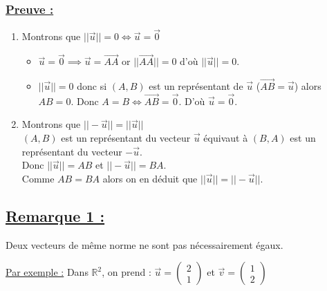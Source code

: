 \documentclass{article}
\begin{document}
\subsubsection*{\underline{\color{red}Preuve :}}
\begin{enumerate}
    \item[i)] Montrons que $||\vec{u}|| = 0 \iff \vec{u} = \vec{0}$
    \begin{itemize}
        \item[$*_{1}$] $\vec{u} = \vec{0} \implies \vec{u} = \overrightarrow{AA}$ or $||\overrightarrow{AA}|| = 0$ d'où $||\vec{u}|| = 0$.
        \item[$*_{2}$] $||\vec{u}|| = 0$ donc si $(A, B)$ est un représentant de $\vec{u}$ ($\overrightarrow{AB} = \vec{u}$) alors $AB = 0$. Donc $A = B \iff \overrightarrow{AB} = \vec{0}$. D'où $\vec{u} = \vec{0}$.
    \end{itemize}
    \item[ii)] Montrons que $||-\vec{u}|| = ||\vec{u}||$ \\
    $(A, B)$ est un représentant du vecteur $\vec{u}$ équivaut à $(B, A)$ est un représentant du vecteur $-\vec{u}$.\\
    Donc $||\vec{u}|| = AB$ et $||-\vec{u}|| = BA$.\\
    Comme $AB = BA$ alors on en déduit que $||\vec{u}|| = ||-\vec{u}||$.
\end{enumerate}

\subsection*{\underline{\color{red}Remarque 1 :}}
Deux vecteurs de même norme ne sont pas nécessairement égaux.

\vspace{0.5em}

\noindent \underline{\color{red}Par exemple :} Dans $\mathbb{R}^2$, on prend :
$\vec{u} = \begin{pmatrix} 2 \\ 1 \end{pmatrix}$ et $\vec{v} = \begin{pmatrix} 1 \\ 2 \end{pmatrix}$
\end{document}
